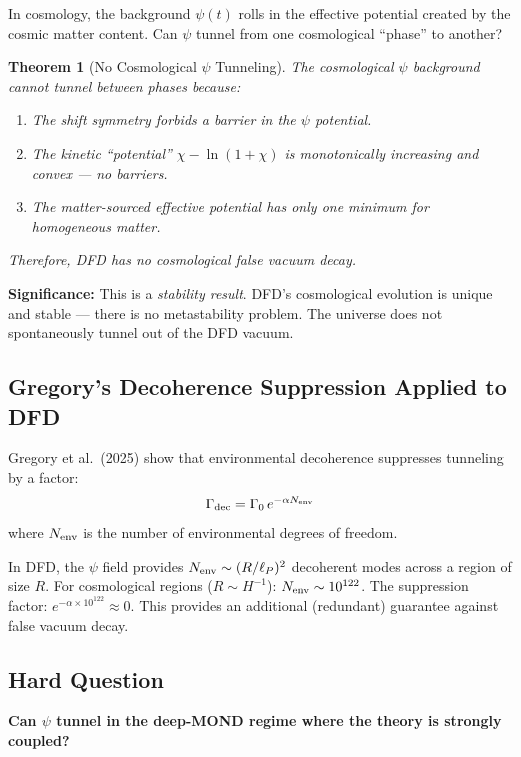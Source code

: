 \documentclass[11pt,a4paper]{article}
\newtheorem{theorem}{Theorem}
\begin{document}
In cosmology, the background $\psi(t)$ rolls in the effective potential created by the cosmic matter content. Can $\psi$ tunnel from one cosmological ``phase'' to another?

\begin{theorem}[No Cosmological $\psi$ Tunneling]
The cosmological $\psi$ background cannot tunnel between phases because:
\begin{enumerate}
\item The shift symmetry forbids a barrier in the $\psi$ potential.
\item The kinetic ``potential'' $\chi - \ln(1+\chi)$ is monotonically increasing and convex --- no barriers.
\item The matter-sourced effective potential has only one minimum for homogeneous matter.
\end{enumerate}
Therefore, DFD has no cosmological false vacuum decay.
\end{theorem}

\textbf{Significance:} This is a \emph{stability result}. DFD's cosmological evolution is unique and stable --- there is no metastability problem. The universe does not spontaneously tunnel out of the DFD vacuum.

\subsection{Gregory's Decoherence Suppression Applied to DFD}

Gregory et al.\ (2025) show that environmental decoherence suppresses tunneling by a factor:
\begin{equation}
\Gamma_{\rm dec} = \Gamma_0\,e^{-\alpha N_{\rm env}}
\end{equation}
where $N_{\rm env}$ is the number of environmental degrees of freedom.

In DFD, the $\psi$ field provides $N_{\rm env} \sim (R/\ell_P)^2$ decoherent modes across a region of size $R$. For cosmological regions ($R \sim H^{-1}$): $N_{\rm env} \sim 10^{122}$. The suppression factor: $e^{-\alpha \times 10^{122}} \approx 0$. This provides an additional (redundant) guarantee against false vacuum decay.

\subsection{Hard Question}

\textbf{Can $\psi$ tunnel in the deep-MOND regime where the theory is strongly coupled?}
\end{document}
